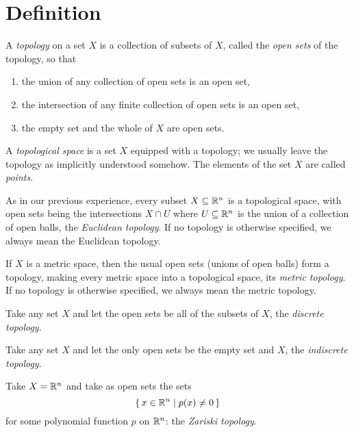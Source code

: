 \section{Definition}
A \emph{topology} on a set \(X\) is a collection of subsets of \(X\), called the \emph{open sets} of the topology, so that
\begin{enumerate}
\item the union of any collection of open sets is an open set,
\item the intersection of any finite collection of open sets is an open set,
\item the empty set and the whole of \(X\) are open sets.
\end{enumerate}
A \emph{topological space} is a set \(X\) equipped with a topology; we usually leave the topology as implicitly understood somehow.
The elements of the set \(X\) are called \emph{points}.
\begin{example}
As in our previous experience, every subset \(X \subseteq \mathbb{R}^{n}\) is a topological space, with open sets being the intersections \(X\cap U\) where \(U \subseteq \mathbb{R}^{n}\) is the union of a collection of open balls, the \emph{Euclidean topology}.
If no topology is otherwise specified, we always mean the Euclidean topology.
\end{example}
\begin{example}
If \(X\) is a metric space, then the usual open sets (unions of open balls) form a topology, making every metric space into a topological space, its \emph{metric topology}.
If no topology is otherwise specified, we always mean the metric topology.
\end{example}
\begin{example}
Take any set \(X\) and let the open sets be all of the subsets of \(X\), the \emph{discrete topology}.
\end{example}
\begin{example}
Take any set \(X\) and let the only open sets be the empty set and \(X\), the \emph{indiscrete topology}.
\end{example}
\begin{example}
Take \(X=\mathbb{R}^{n}\) and take as open sets the sets
\[
\set{x \in \ensuremath{\mathbb{R}^{n}}|p(x) \ne 0}
\]
for some polynomial function \(p\) on \(\mathbb{R}^{n}\): the \emph{Zariski topology}.
\end{example}

